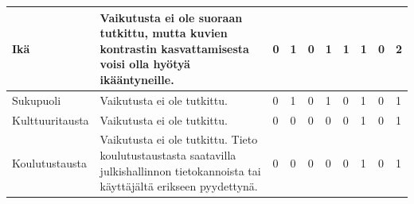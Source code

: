 \documentclass[finnish, 12pt, a4paper, elec, utf8, a-1b, online]{aaltothesis}
\begin{document}
{\begin{longtable}{p{2.5cm}|p{6cm}|p{0.5cm}p{0.5cm}p{0.5cm}|p{0.5cm}|p{0.5cm}p{0.5cm}p{0.5cm}|p{0.5cm}|}
        \midrule
        Ikä                                    & Vaikutusta ei ole suoraan tutkittu, mutta kuvien kontrastin kasvattamisesta voisi olla hyötyä ikääntyneille.                                                                                                                                                                                                                                                              & 0                                          & 1                                   & 0                                      & 1                            & 1                                               & 1                                         & 0                                         & 2                            \\
        \midrule
        Sukupuoli                              & Vaikutusta ei ole tutkittu.                                                                                                                                                                                                                                                                                                                                               & 0                                          & 1                                   & 0                                      & 1                            & 0                                               & 1                                         & 0                                         & 1                            \\
        \midrule
        Kulttuuritausta                        & Vaikutusta ei ole tutkittu.                                                                                                                                                                                                                                                                                                                                               & 0                                          & 0                                   & 0                                      & 0                            & 0                                               & 1                                         & 0                                         & 1                            \\
        \midrule
        Koulutustausta                         & Vaikutusta ei ole tutkittu. Tieto koulutustaustasta saatavilla julkishallinnon tietokannoista tai käyttäjältä erikseen pyydettynä.                                                                                                                                                                                                                                        & 0                                          & 0                                   & 0                                      & 0                            & 0                                               & 1                                         & 0                                         & 1                            \\

\end{longtable}}
\end{document}

